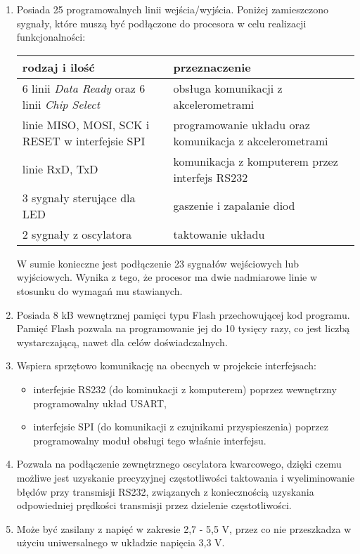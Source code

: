\begin{enumerate}
\item Posiada 25 programowalnych linii wejścia/wyjścia. Poniżej zamieszczono sygnały, które muszą być podłączone do procesora w celu realizacji funkcjonalności:
\begin{table}[H]
{\centering
	\begin{tabular}{|p{6cm}|p{7cm}|} \hline
		\textbf{rodzaj i ilość} & \textbf{przeznaczenie} \\ \hline
		6 linii \textit{Data Ready} oraz 6 linii \textit{Chip Select} & obsługa komunikacji z akcelerometrami \\ \hline
		linie MISO, MOSI, SCK i RESET w interfejsie SPI & programowanie układu oraz komunikacja z akcelerometrami \\ \hline
		linie RxD, TxD & komunikacja z komputerem przez interfejs RS232 \\ \hline
		3 sygnały sterujące dla LED & gaszenie i zapalanie diod \\ \hline
		2 sygnały z oscylatora & taktowanie układu \\ \hline
	\end{tabular}
}
\end{table}

W sumie konieczne jest podłączenie 23 sygnałów wejściowych lub wyjściowych. Wynika z tego, że procesor ma dwie nadmiarowe linie w stosunku do wymagań mu stawianych.

\item Posiada 8 kB wewnętrznej pamięci typu Flash przechowującej kod programu.
Pamięć Flash pozwala na programowanie jej do 10 tysięcy razy, co jest liczbą wystarczającą, nawet dla celów doświadczalnych.

\item Wspiera sprzętowo komunikację na obecnych w projekcie interfejsach:
	\begin{itemize}
		\item interfejsie RS232 (do kominukacji z komputerem) poprzez wewnętrzny programowalny układ USART,
		\item interfejsie SPI (do komunikacji z czujnikami przyspieszenia) poprzez programowalny moduł obsługi tego właśnie interfejsu.
	\end{itemize}
\item Pozwala na podłączenie zewnętrznego oscylatora kwarcowego, dzięki czemu możliwe jest uzyskanie precyzyjnej częstotliwości taktowania i wyeliminowanie błędów przy transmisji RS232, związanych z koniecznością uzyskania odpowiedniej prędkości transmisji przez dzielenie częstotliwości.

\item Może być zasilany z napięć w zakresie 2,7 - 5,5 V, przez co nie przeszkadza w użyciu uniwersalnego w układzie napięcia 3,3 V.
\end{enumerate}
